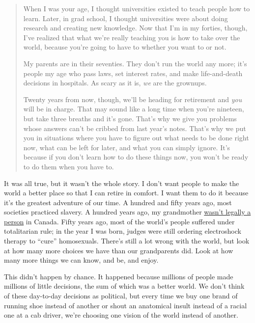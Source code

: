 \begin{quote}\setlength{\parindent}{0pt}
When I was your age, I thought universities existed to teach people
how to learn. Later, in grad school, I thought universities were about
doing research and creating new knowledge. Now that I'm in my forties,
though, I've realized that what we're really teaching you is how to
take over the world, because you're going to have to whether you want
to or not.

My parents are in their seventies. They don't run the world any more;
it's people my age who pass laws, set interest rates, and make
life-and-death decisions in hospitals. As scary as it is, \emph{we} are the
grownups.

Twenty years from now, though, we'll be heading for retirement and
\emph{you} will be in charge. That may sound like a long time when you're
nineteen, but take three breaths and it's gone. That's why we give you
problems whose answers can't be cribbed from last year's notes. That's
why we put you in situations where you have to figure out what needs
to be done right now, what can be left for later, and what you can
simply ignore. It's because if you don't learn how to do these things
now, you won't be ready to do them when you have to.
\end{quote}

It was all true, but it wasn't the whole story. I don't want people to
make the world a better place so that I can retire in comfort. I want
them to do it because it's the greatest adventure of our time. A
hundred and fifty years ago, most societies practiced slavery. A
hundred years ago, my grandmother \href{https://en.wikipedia.org/wiki/The_Famous_Five_(Canada)}{wasn't legally a
person} in Canada. Fifty years ago, most of the world's
people suffered under totalitarian rule; in the year I was born,
judges were still ordering electroshock therapy to ``cure''
homosexuals. There's still a lot wrong with the world, but look at how
many more choices we have than our grandparents did. Look at how many
more things we can know, and be, and enjoy.

This didn't happen by chance. It happened because millions of people
made millions of little decisions, the sum of which was a better world.
We don't think of these day-to-day decisions as political, but every
time we buy one brand of running shoe instead of another or shout an
anatomical insult instead of a racial one at a cab driver, we're
choosing one vision of the world instead of another.

